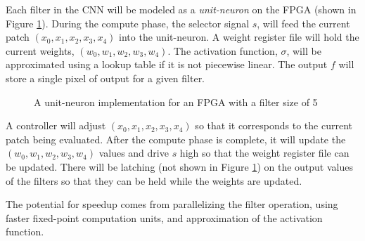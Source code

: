 Each filter in the CNN will be modeled as a \textit{unit-neuron} on the FPGA (shown in Figure \ref{fig:unit-neuron}). During the compute phase, the selector signal $s$, will feed the current patch $(x_0, x_1, x_2, x_3, x_4)$ into the unit-neuron. A weight register file will hold the current weights, $(w_0, w_1, w_2, w_3, w_4)$. The activation function, $\sigma$, will be approximated using a lookup table if it is not piecewise linear. The output $f$ will store a single pixel of output for a given filter.
\begin{figure}[!hb]
	\centering
	\caption{A unit-neuron implementation for an FPGA with a filter size of 5}
	\label{fig:unit-neuron}
\end{figure}

A controller will adjust $(x_0, x_1, x_2, x_3, x_4)$ so that it corresponds to the current patch being evaluated. After the compute phase is complete, it will update the $(w_0, w_1, w_2, w_3, w_4)$ values and drive $s$ high so that the weight register file can be updated. There will be latching (not shown in Figure \ref{fig:unit-neuron}) on the output values of the filters so that they can be held while the weights are updated.

The potential for speedup comes from parallelizing the filter operation, using faster fixed-point computation units, and approximation of the activation function.